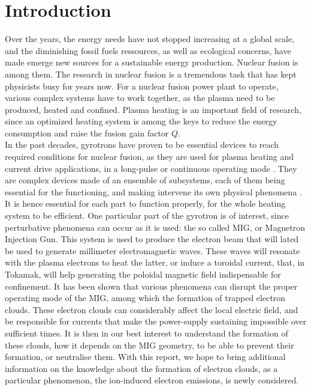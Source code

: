 \section{Introduction}

Over the years, the energy needs have not stopped increasing at a global scale, and the diminishing fossil fuels ressources, as well as ecological concerns, have made emerge new sources for a sustainable energy production. Nuclear fusion is among them. The research in nuclear fusion is a tremendous task that has kept physicists busy for years now. For a nuclear fusion power plant to operate, various complex systems have to  work together, as the plasma need to be produced, heated and confined. Plasma heating is an important field of research, since an optimized heating system is among the keys to reduce the energy consumption and raise the fusion gain factor $Q$. \\

In the past decades, gyrotrons have proven to be essential devices to reach required conditions for nuclear fusion, as they are used for plasma heating and current drive applications, in a long-pulse or continuous operating mode \cite{Fisch}. They are complex devices made of an ensemble of subsystems, each of them being essential for the functioning, and making intervene its own physical phenomena \cite{ITER_gyrotrons}. It is hence essential for each part to function properly, for the whole heating system to be efficient. One particular part of the gyrotron is of interest, since perturbative phenomena can occur as it is used: the so called MIG, or Magnetron Injection Gun. This system is used to produce the electron beam that will lated be used to generate millimeter electromagnetic waves. These waves will resonate with the plasma electrons to heat the latter, or induce a toroidal current, that, in Tokamak, will help generating the poloidal magnetic field indispensable for confinement. It has been shown that various phenomena can disrupt the proper operating mode of the MIG, among which the formation of trapped electron clouds. These electron clouds can considerably affect the local electric field, and be responsible for currents that make the power-supply sustaining impossible over sufficient times. It is then in our best interest to understand the formation of these clouds, how it depends on the MIG geometry, to be able to prevent their formation, or neutralise them. With this report, we hope to bring additional information on the knowledge about the formation of electron clouds, as a particular phenomenon, the ion-induced electron emissions, is newly considered. \\

